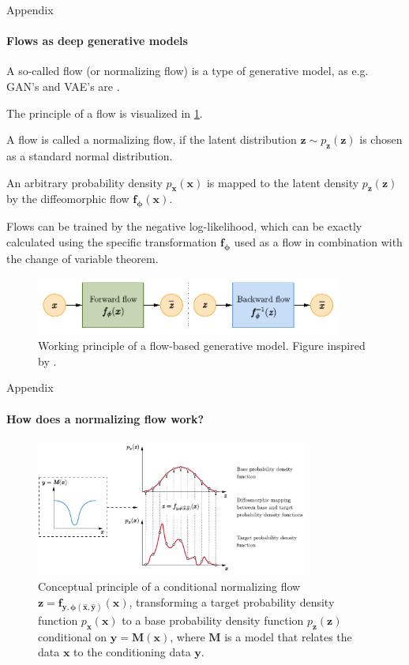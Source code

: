 \documentclass{beamer}
\newcommand\matr[1]{\ensuremath{\boldsymbol{\mathbf{#1}}}}
\newcommand\vect[1]{\ensuremath{\bm{#1}}}
\begin{document}
\begin{frame}[allowframebreaks]{Appendix}
	\framesubtitle{Flows as deep generative models}
	A so-called flow (or normalizing flow) is a type of generative model, as e.g. GAN's and VAE's are \cite{weng2018flow}.
	
	The principle of a flow is visualized in \cref{fig:Flow}.
	
	A flow is called a normalizing flow, if the latent distribution $\vect{z}\sim p_{\vect{z}}(\vect{z})$ is chosen as a standard normal distribution.
	
	An arbitrary probability density $p_{\vect{x}}(\vect{x})$ is mapped to the latent density $p_{\vect{z}}(\vect{z})$ by the diffeomorphic flow $\vect{f}_{\vect{\phi}}(\vect{x})$.
	
	Flows can be trained by the negative log-likelihood, which can be exactly calculated using the specific transformation $\vect{f}_{\vect{\phi}}$ used as a flow in combination with the change of variable theorem.
	
	\begin{figure}[h!]
		\centering
		\includegraphics[width=0.9\textwidth]{figures/thesis/Flow.pdf}
		\caption{Working principle of a flow-based generative model. Figure inspired by \cite{weng2018flow}.}
		\label{fig:Flow}
	\end{figure}
\end{frame}

\begin{frame}[allowframebreaks]{Appendix}
	\framesubtitle{How does a normalizing flow work?}
	\begin{figure}[h]
		\centering
		\includegraphics[width=0.8\textwidth]{figures/thesis/normflowconditional.pdf}
		\caption{Conceptual principle of a conditional normalizing flow $\vect{z} = \vect{f}_{\vect{y},\vect{\phi}(\hat{\matr{x}},\hat{\matr{y}})}(\vect{x})$, transforming a target probability density function $p_{\vect{x}}(\vect{x})$ to a base probability density function $p_{\vect{z}}(\vect{z})$ conditional on $\vect{y} = \vect{M}(\vect{x})$, where $\vect{M}$ is a model that relates the data $\vect{x}$ to the conditioning data $\vect{y}$.}
		\label{fig:normflowconditional}
	\end{figure}
\end{frame}
\end{document}
